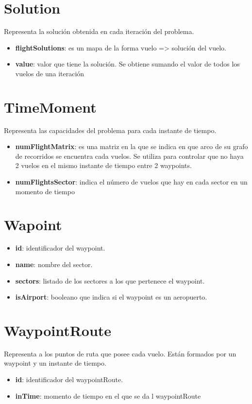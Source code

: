\section{Solution}
Representa la solución obtenida en cada iteración del problema.
\begin{itemize}
	\item \textbf{flightSolutions}: es un mapa de la forma vuelo => solución del vuelo.
	\item \textbf{value}: valor que tiene la solución. Se obtiene sumando el valor de todos los vuelos de una iteración
\end{itemize}

\section{TimeMoment}
Representa las capacidades del problema para cada instante de tiempo.
\begin{itemize}
	\item \textbf{numFlightMatrix}: es una matriz en la que se indica en que arco de su grafo de recorridos se encuentra cada vuelos. Se utiliza para controlar que no haya 2 vuelos en el mismo instante de tiempo entre 2 waypoints.
	\item \textbf{numFlightsSector}: indica el número de vuelos que hay en cada sector en un momento de tiempo
\end{itemize}

\section{Wapoint}
\begin{itemize}
	\item \textbf{id}: identificador del waypoint.
	\item \textbf{name}: nombre del sector.
	\item \textbf{sectors}: listado de los sectores a los que pertenece el waypoint.
	\item \textbf{isAirport}: booleano que indica si el waypoint es un aeropuerto.
\end{itemize}

\section{WaypointRoute}
Representa a los puntos de ruta que posee cada vuelo. Están formados por un waypoint y un instante de tiempo.
\begin{itemize}
	\item \textbf{id}: identificador del waypointRoute.
	\item \textbf{inTime}: momento de tiempo en el que se da l waypointRoute
\end{itemize}